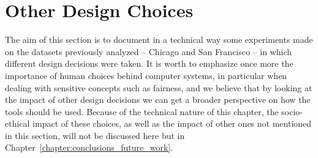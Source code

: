 \section{Other Design Choices}
The aim of this section is to document in a technical way some experiments made on the datasets previously analyzed -- Chicago and San Francisco -- in which different design decisions were taken. It is worth to emphasize once more the importance of human choices behind computer systems, in particular when dealing with sensitive concepts such as fairness, and we believe that by looking at the impact of other design decisions we can get a broader perspective on how the tools should be used.
Because of the technical nature of this chapter, the socio-ethical impact of these choices, as well as the impact of other ones not mentioned in this section, will not be discussed here but in Chapter~\ref{chapter:conclusions_future_work}.


